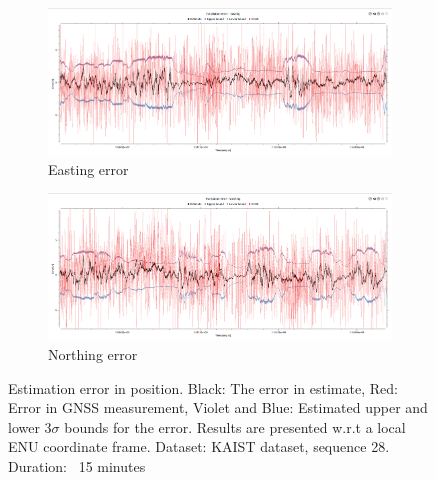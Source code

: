 \begin{figure}[h]
	\centering
    \begin{subfigure}{\textwidth}
        \includegraphics[width=\textwidth]{figs/easting_error.png}
        \caption{Easting error}
    \end{subfigure}
    \begin{subfigure}{\textwidth}
        \includegraphics[width=\textwidth]{figs/northing_error.png}
        \caption{Northing error}
    \end{subfigure}
    \caption[Estimation error in position]{Estimation error in position. Black: The error in estimate, Red: Error in \gls{GNSS} measurement, Violet and Blue: Estimated upper and lower 3$\sigma$ bounds for the error. Results are presented w.r.t a local \gls{ENU} coordinate frame. Dataset: \gls{KAIST} dataset, sequence 28. Duration: ~15 minutes}
    \label{fig:pa:estimationError}
\end{figure}

